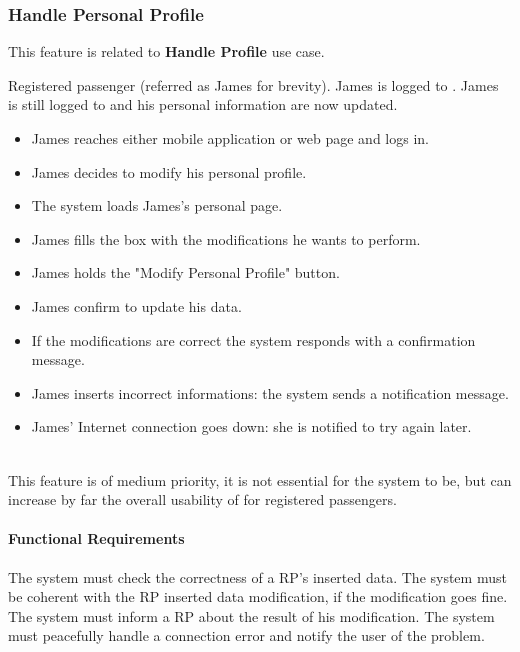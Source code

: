 \subsubsection{Handle Personal Profile}
This feature is related to \textbf{Handle Profile} use case.
\begin{itemize}
	 Registered passenger (referred as James for brevity).
	 James is logged to \myTaxiService{}.
	 James is still logged to \myTaxiService{} and his personal information are now updated.
	\begin{itemize}
		\item James reaches either \myTaxiService{} mobile application or web page and logs in.
		\item James decides to modify his personal profile.
		\item The system loads James's personal page.
		\item James fills the box with the modifications he wants to perform.
		\item James holds the "Modify Personal Profile" button.
		\item James confirm to update his data.
		\item If the modifications are correct the system responds with a confirmation message.
	\end{itemize}
	\begin{itemize}
		\item James inserts incorrect informations: the system sends a notification message.
		\item James' Internet connection goes down: she is notified to try again later.
	\end{itemize}
\end{itemize}
\\
This feature is of medium priority, it is not essential for the system to be, but can increase by far the overall usability of \myTaxiService{} for registered passengers.
\paragraph{Functional Requirements}
\begin{itemize}
	 The system must check the correctness of a RP's inserted data.
	 The system must be coherent with the RP inserted data modification, if the modification goes fine.
	 The system must inform a RP about the result of his modification.
	 The system must peacefully handle a connection error and notify the user of the problem.
\end{itemize}
